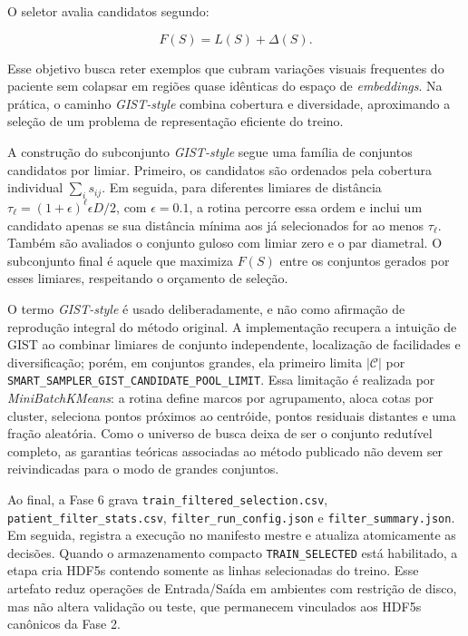 O seletor avalia candidatos segundo:

\begin{equation}
    F(S)=L(S)+\Delta(S).
    \label{eq:gist_objective}
\end{equation}

Esse objetivo busca reter exemplos que cubram variações visuais frequentes do
paciente sem colapsar em regiões quase idênticas do espaço de \textit{embeddings}. Na
prática, o caminho \textit{GIST-style} combina cobertura e diversidade, aproximando a
seleção de um problema de representação eficiente do treino.

A construção do subconjunto \textit{GIST-style} segue uma família de conjuntos candidatos
por limiar. Primeiro, os candidatos são ordenados pela cobertura individual
$\sum_i s_{ij}$. Em seguida, para diferentes limiares de distância
$\tau_\ell=(1+\epsilon)^\ell\epsilon D/2$, com $\epsilon=0.1$, a rotina percorre
essa ordem e inclui um candidato apenas se sua distância mínima aos já
selecionados for ao menos $\tau_\ell$. Também são avaliados o conjunto guloso
com limiar zero e o par diametral. O subconjunto final é aquele que maximiza
$F(S)$ entre os conjuntos gerados por esses limiares, respeitando o orçamento de
seleção.

O termo \textit{GIST-style} é usado deliberadamente, e não como afirmação de reprodução
integral do método original. A implementação recupera a intuição de GIST ao
combinar limiares de conjunto independente, localização de facilidades e
diversificação; porém, em conjuntos grandes, ela primeiro limita
$|\mathcal{C}|$ por \texttt{SMART\_SAMPLER\_GIST\_CANDIDATE\_POOL\_LIMIT}. Essa
limitação é realizada por \textit{MiniBatchKMeans}: a rotina define marcos por
agrupamento, aloca cotas por cluster, seleciona pontos próximos ao centróide,
pontos residuais distantes e uma fração aleatória. Como o universo de busca
deixa de ser o conjunto redutível completo, as garantias teóricas associadas ao
método publicado não devem ser reivindicadas para o modo de grandes conjuntos.

Ao final, a Fase 6 grava \texttt{train\_filtered\_selection.csv},
\texttt{patient\_filter\_stats.csv}, \texttt{filter\_run\_config.json} e
\texttt{filter\_summary.json}. Em seguida, registra a execução no manifesto
mestre e atualiza atomicamente as decisões. Quando o armazenamento compacto
\texttt{TRAIN\_SELECTED} está habilitado, a etapa cria HDF5s contendo somente as
linhas selecionadas do treino. Esse artefato reduz operações de Entrada/Saída em ambientes com restrição de
disco, mas não altera validação ou teste, que permanecem vinculados aos HDF5s
canônicos da Fase 2.

